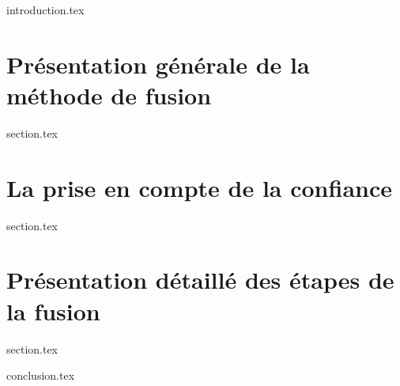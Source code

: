 
\chaptertoc{}

\label{chap:08-int}
{introduction.tex}

\section{Présentation générale de la méthode de fusion}
\label{chap:08-sec1}
{section.tex}

\section{La prise en compte de la confiance}
\label{chap:08-sec2}
{section.tex}

\section{Présentation détaillé des étapes de la fusion}
\label{chap:08-sec3}
{section.tex}

\label{chap:08-cnc}
{conclusion.tex}

